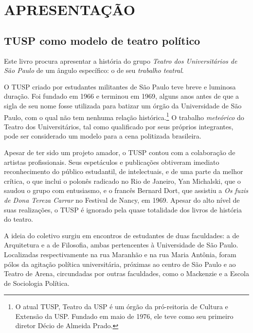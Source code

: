 







\chapter{APRESENTAÇÃO}

\section{TUSP como modelo de teatro político}

Este livro procura apresentar a história do grupo \textit{Teatro dos
Universitários de São Paulo} de um ângulo específico: o de seu
\textit{trabalho teatral}.

O TUSP criado por estudantes militantes de São Paulo teve breve e
luminosa duração. Foi fundado em 1966 e terminou em 1969, alguns anos
antes de que a sigla de seu nome fosse utilizada para batizar um órgão
da Universidade de São Paulo, com o qual não tem nenhuma relação
histórica.\footnote{O atual TUSP, Teatro da USP é um órgão da
  pró-reitoria de Cultura e Extensão da USP. Fundado em maio de 1976,
  ele teve como seu primeiro diretor Décio de Almeida Prado.} O trabalho
\textit{meteórico} do Teatro dos Universitários, tal como qualificado por
seus próprios integrantes, pode ser considerado um modelo para a cena
politizada brasileira.

Apesar de ter sido um projeto amador, o TUSP contou com a colaboração de
artistas profissionais. Seus espetáculos e publicações obtiveram
imediato reconhecimento do público estudantil, de intelectuais, e de uma
parte da melhor crítica, o que inclui o polonês radicado no Rio de
Janeiro, Yan Michalski, que o saudou o grupo com entusiasmo, e o francês
Bernard Dort, que assistiu a \textit{Os fuzis de Dona Tereza Carrar} no
Festival de Nancy, em 1969. Apesar do alto nível de suas realizações, o
TUSP é ignorado pela quase totalidade dos livros de história do teatro.

A ideia do coletivo surgiu em encontros de estudantes de duas
faculdades: a de Arquitetura e a de Filosofia, ambas pertencentes à
Universidade de São Paulo. Localizadas respectivamente na rua Maranhão e
na rua Maria Antônia, foram pólos da agitação política universitária,
próximas ao centro de São Paulo e ao Teatro de Arena, circundadas por
outras faculdades, como o Mackenzie e a Escola de Sociologia Política.

